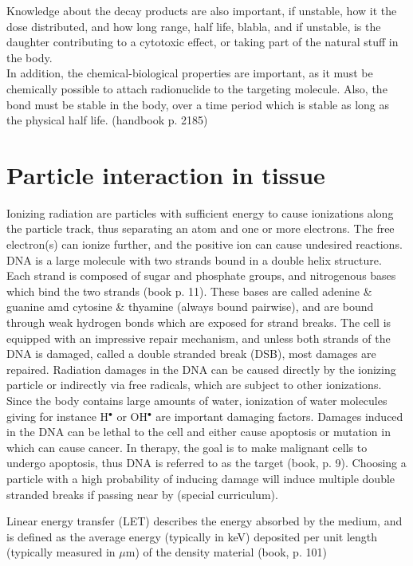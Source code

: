 \documentclass[a4paper,11pt,twoside]{book}
\begin{document}
Knowledge about the decay products are also important, if unstable, how it the dose distributed, and how long range, half life, blabla, and if unstable, is the daughter contributing to a cytotoxic effect, or taking part of the natural stuff in the body. \\

In addition, the chemical-biological properties are important, as it must be chemically possible to attach radionuclide to the targeting molecule. Also, the bond must be stable in the body, over a time period which is stable as long as the physical half life. (handbook p. 2185)

\section{Particle interaction in tissue}

Ionizing radiation are particles with sufficient energy to cause ionizations along the particle track, thus separating an atom and one or more electrons. The free electron(s) can ionize further, and the positive ion can cause undesired reactions. DNA is a large molecule with two strands bound in a double helix structure. Each strand is composed of sugar and phosphate groups, and nitrogenous bases which bind the two strands (book p. 11). These  bases are called adenine \& guanine amd cytosine \& thyamine (always bound pairwise), and are bound through weak hydrogen bonds which are exposed for strand breaks. The cell is equipped with an impressive repair mechanism, and unless both strands of the DNA is damaged, called a double stranded break (DSB), most damages are repaired. Radiation damages in the DNA can be caused directly by the ionizing particle or indirectly via free radicals, which are subject to other ionizations. Since the body contains large amounts of water, ionization of water molecules giving for instance H$^\bullet$ or OH$^\bullet$ are important damaging factors. Damages induced in the DNA can be lethal to the cell and either cause apoptosis or mutation in which can cause cancer. In therapy, the goal is to make malignant cells to undergo apoptosis, thus DNA is referred to as the target (book, p. 9). Choosing a particle with a high probability of inducing damage will induce multiple double stranded breaks if passing near by (special curriculum). 

Linear energy transfer (LET) describes the energy absorbed by the medium, and is defined as the average energy (typically in keV) deposited per unit length (typically measured in $\mu$m) of the density material (book, p. 101)
\end{document}
